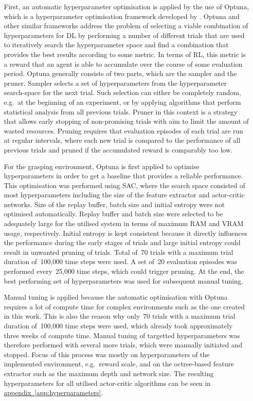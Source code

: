 First, an automatic hyperparameter optimisation is applied by the use of Optuna, which is a hyperparameter optimisation framework developed by \citet{akiba_optuna_2019}. Optuna and other similar frameworks address the problem of selecting a viable combination of hyperparameters for DL by performing a number of different trials that are used to iteratively search the hyperparameter space and find a combination that provides the best results according to some metric. In terms of RL, this metric is a reward that an agent is able to accumulate over the course of some evaluation period. Optuna generally consists of two parts, which are the sampler and the pruner. Sampler selects a set of hyperparameters from the hyperparameter search-space for the next trial. Such selection can either be completely random, e.g.~at the beginning of an experiment, or by applying algorithms that perform statistical analysis from all previous trials. Pruner in this context is a strategy that allows early stopping of non-promising trials with aim to limit the amount of wasted resources. Pruning requires that evaluation episodes of each trial are run at regular intervals, where each new trial is compared to the performance of all previous trials and pruned if the accumulated reward is comparably too low.

For the grasping environment, Optuna is first applied to optimise hyperparameters in order to get a baseline that provides a reliable performance. This optimisation was performed using SAC, where the search space consisted of most hyperparameters including the size of the feature extractor and actor-critic networks. Size of the replay buffer, batch size and initial entropy were not optimised automatically. Replay buffer and batch size were selected to be adequately large for the utilised system in terms of maximum RAM and VRAM usage, respectively. Initial entropy is kept consistent because it directly influences the performance during the early stages of trials and large initial entropy could result in unwanted pruning of trials. Total of~70 trials with a maximum trial duration of~100,000 time steps were used. A set of~20 evaluation episodes was performed every~25,000 time steps, which could trigger pruning. At the end, the best performing set of hyperparameters was used for subsequent manual tuning.

Manual tuning is applied because the automatic optimisation with Optuna requires a lot of compute time for complex environments such as the one created in this work. This is also the reason why only~70 trials with a maximum trial duration of~100,000 time steps were used, which already took approximately three weeks of compute time. Manual tuning of targetted hyperparameters was therefore performed with several more trials, which were manually initiated and stopped. Focus of this process was mostly on hyperparameters of the implemented environment, e.g.~reward scale, and on the octree-based feature extractor such as the maximum depth and network size. The resulting hyperparameters for all utilised actor-critic algorithms can be seen in \hyperref[app:hyperparameters]{appendix~\ref*{app:hyperparameters}}.
